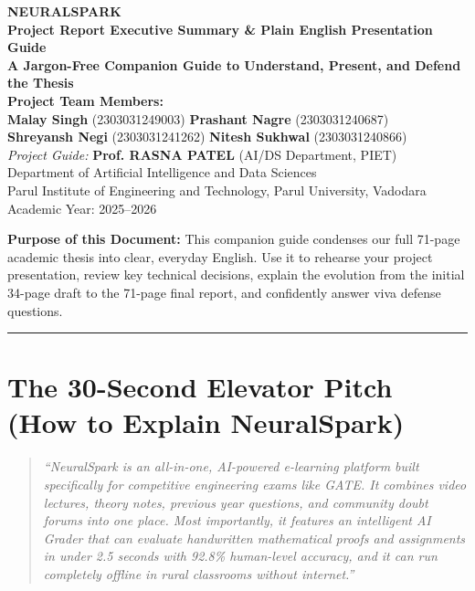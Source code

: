 \documentclass[11pt,a4paper]{article}
\begin{document}
\begin{center}
    {\Huge\bfseries\textcolor{primaryblue}{NEURALSPARK}}\\[0.2cm]
    {\Large\bfseries Project Report Executive Summary \& Plain English Presentation Guide}\\[0.25cm]
    {\normalsize\textbf{A Jargon-Free Companion Guide to Understand, Present, and Defend the Thesis}}\\[0.35cm]
    
    \textbf{Project Team Members:}\\
    \textbf{Malay Singh} (2303031249003) \quad \textbf{Prashant Nagre} (2303031240687)\\
    \textbf{Shreyansh Negi} (2303031241262) \quad \textbf{Nitesh Sukhwal} (2303031240866)\\[0.15cm]
    
    \textit{Project Guide:} \textbf{Prof. RASNA PATEL} (AI/DS Department, PIET)\\[0.05cm]
    \small Department of Artificial Intelligence and Data Sciences\\
    Parul Institute of Engineering and Technology, Parul University, Vadodara\\
    Academic Year: 2025--2026
\end{center}

\vspace{0.15cm}
\begin{center}
\colorbox{boxbg}{\parbox{0.95\textwidth}{\centering\small
\textbf{Purpose of this Document:} This companion guide condenses our full 71-page academic thesis into clear, everyday English. Use it to rehearse your project presentation, review key technical decisions, explain the evolution from the initial 34-page draft to the 71-page final report, and confidently answer viva defense questions.}}
\end{center}

\vspace{0.25cm}
\hrule
\vspace{0.35cm}

\section{The 30-Second Elevator Pitch (How to Explain NeuralSpark)}
\begin{quote}
\itshape
``NeuralSpark is an all-in-one, AI-powered e-learning platform built specifically for competitive engineering exams like GATE. It combines video lectures, theory notes, previous year questions, and community doubt forums into one place. Most importantly, it features an intelligent AI Grader that can evaluate handwritten mathematical proofs and assignments in under 2.5 seconds with 92.8\% human-level accuracy, and it can run completely offline in rural classrooms without internet.''
\end{quote}
\end{document}
